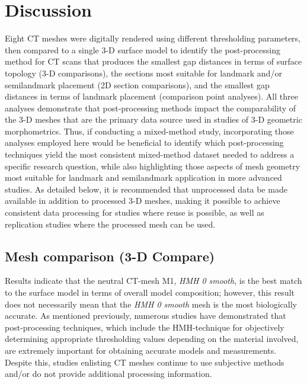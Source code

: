 \documentclass[review]{elsarticle}
\begin{document}
\section{Discussion}

Eight CT meshes were digitally rendered using different thresholding parameters, then compared to a single 3-D surface model to identify the post-processing method for CT scans that produces the smallest gap distances in terms of surface topology (3-D comparisons), the sections most suitable for landmark and/or semilandmark placement (2D section comparisons), and the smallest gap distances in terms of landmark placement (comparison point analyses). All three analyses demonstrate that post-processing methods impact the comparability of the 3-D meshes that are the primary data source used in studies of 3-D geometric morphometrics. Thus, if conducting a mixed-method study, incorporating those analyses employed here would be beneficial to identify which post-processing techniques yield the most consistent mixed-method dataset needed to address a specific research question, while also highlighting those aspects of mesh geometry most suitable for landmark and semilandmark application in more advanced studies. As detailed below, it is recommended that unprocessed data be made available in addition to processed 3-D meshes, making it possible to achieve consistent data processing for studies where reuse is possible, as well as replication studies where the processed mesh can be used.

\subsection{Mesh comparison (3-D Compare)}

Results indicate that the neutral CT-mesh M1, \textit{HMH 0 smooth}, is the best match to the surface model in terms of overall model composition; however, this result does not necessarily mean that the \textit{HMH 0 smooth} mesh is the most biologically accurate. As mentioned previously, numerous studies  \citep{RN11483,RN11485,RN11486} have demonstrated that post-processing techniques, which include the HMH-technique for objectively determining appropriate thresholding values depending on the material involved, are extremely important for obtaining accurate models and measurements. Despite this, studies enlisting CT meshes continue to use subjective methods and/or do not provide additional processing information.
\end{document}
